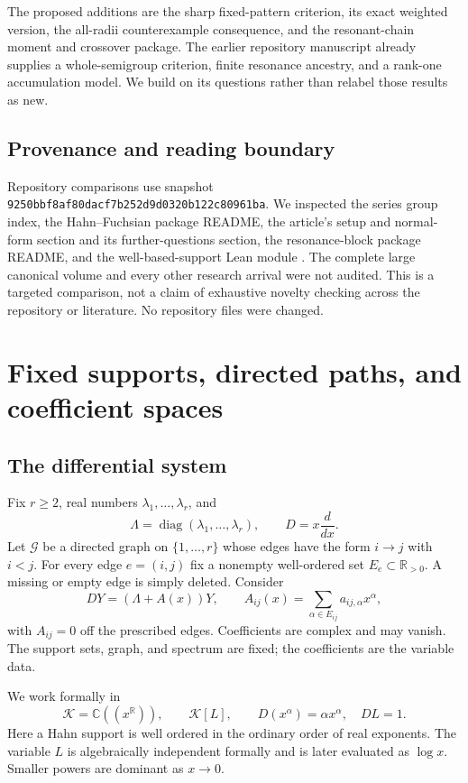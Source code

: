 \documentclass[11pt,a4paper]{article}
\numberwithin{equation}{section}
\theoremstyle{definition}
\theoremstyle{remark}
\newcommand{\R}{\mathbb R}
\newcommand{\C}{\mathbb C}
\newcommand{\K}{\mathcal K}
\newcommand{\G}{\mathcal G}
\newcommand{\diag}{\operatorname{diag}}
\newcommand{\snap}{\texttt{9250bbf8af80dacf7b252d9d0320b122c80961ba}}
\begin{document}
The proposed additions are the sharp fixed-pattern criterion, its exact
weighted version, the all-radii counterexample consequence, and the
resonant-chain moment and crossover package. The earlier repository
manuscript already supplies a whole-semigroup criterion, finite resonance
ancestry, and a rank-one accumulation model. We build on its questions
rather than relabel those results as new.

\subsection{Provenance and reading boundary}
Repository comparisons use snapshot \snap. We inspected the series group
index, the Hahn--Fuchsian package README, the article's setup and normal-form
section and its further-questions section, the resonance-block package
README, and the well-based-support Lean module \cite{repo-index,repo-hahn,
repo-block,repo-lean}. The complete large canonical volume and every other
research arrival were not audited. This is a targeted comparison, not a
claim of exhaustive novelty checking across the repository or literature.
No repository files were changed.

\section{Fixed supports, directed paths, and coefficient spaces}
\label{sec:setup}

\subsection{The differential system}
Fix $r\geq2$, real numbers $\lambda_1,\ldots,\lambda_r$, and
\[
 \Lambda=\diag(\lambda_1,\ldots,\lambda_r),\qquad
 D=x\frac{d}{dx}.
\]
Let $\G$ be a directed graph on $\{1,\ldots,r\}$ whose edges have the form
$i\to j$ with $i<j$. For every edge $e=(i,j)$ fix a nonempty well-ordered
set $E_e\subset\R_{>0}$. A missing or empty edge is simply deleted.
Consider
\begin{equation}\label{eq:system}
 DY=(\Lambda+A(x))Y,\qquad
 A_{ij}(x)=\sum_{\alpha\in E_{ij}}a_{ij,\alpha}x^\alpha,
\end{equation}
with $A_{ij}=0$ off the prescribed edges. Coefficients are complex and may
vanish. The support sets, graph, and spectrum are fixed; the coefficients
are the variable data.

We work formally in
\[
 \K=\C((x^\R)),\qquad \K[L],\qquad
 D(x^\alpha)=\alpha x^\alpha,\quad DL=1.
\]
Here a Hahn support is well ordered in the ordinary order of real
exponents. The variable $L$ is algebraically independent formally and is
later evaluated as $\log x$. Smaller powers are dominant as $x\to0$.
\end{document}
